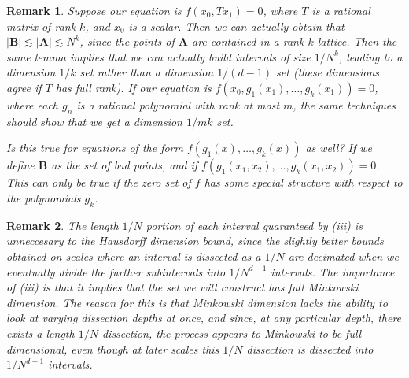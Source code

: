 \documentclass{report}
\theoremstyle{plain}
\theoremstyle{plain}
\newtheorem*{remark}{Remark}
\begin{document}
\begin{remark}
    Suppose our equation is $f(x_0, Tx_1) = 0$, where $T$ is a rational matrix of rank $k$, and $x_0$ is a scalar. Then we can actually obtain that $|\mathbf{B}| \lesssim |\mathbf{A}| \lesssim N^k$, since the points of $\mathbf{A}$ are contained in a rank $k$ lattice. Then the same lemma implies that we can actually build intervals of size $1/N^k$, leading to a dimension $1/k$ set rather than a dimension $1/(d-1)$ set (these dimensions agree if $T$ has full rank). If our equation is $f(x_0, g_1(x_1), \dots, g_k(x_1)) = 0$, where each $g_n$ is a rational polynomial with rank at most $m$, the same techniques should show that we get a dimension $1/mk$ set.

    Is this true for equations of the form $f(g_1(x), \dots, g_k(x))$ as well? If we define $\mathbf{B}$ as the set of bad points, and if $f(g_1(x_1,x_2), \dots, g_k(x_1,x_2)) = 0$. This can only be true if the zero set of $f$ has some special structure with respect to the polynomials $g_k$.
\end{remark}

\begin{remark}
    The length $1/N$ portion of each interval guaranteed by (iii) is unneccesary to the Hausdorff dimension bound, since the slightly better bounds obtained on scales where an interval is dissected as a $1/N$ are decimated when we eventually divide the further subintervals into $1/N^{d-1}$ intervals. The importance of (iii) is that it implies that the set we will construct has full {\it Minkowski dimension}. The reason for this is that Minkowski dimension lacks the ability to look at varying dissection depths at once, and since, at any particular depth, there exists a length $1/N$ dissection, the process appears to Minkowski to be full dimensional, even though at later scales this $1/N$ dissection is dissected into $1/N^{d-1}$ intervals.
\end{remark}
\end{document}
